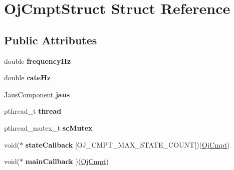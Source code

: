 \hypertarget{struct_oj_cmpt_struct}{\section{\-Oj\-Cmpt\-Struct \-Struct \-Reference}
\label{struct_oj_cmpt_struct}
}
\subsection*{\-Public \-Attributes}
\begin{DoxyCompactItemize}
\item 
\hypertarget{struct_oj_cmpt_struct_ae3a65bcae4e477b648a72cc26403dfec}{double {\bfseries frequency\-Hz}}\label{struct_oj_cmpt_struct_ae3a65bcae4e477b648a72cc26403dfec}

\item 
\hypertarget{struct_oj_cmpt_struct_a2cf5845176e0d4ecd136331aa1e3f476}{double {\bfseries rate\-Hz}}\label{struct_oj_cmpt_struct_a2cf5845176e0d4ecd136331aa1e3f476}

\item 
\hypertarget{struct_oj_cmpt_struct_a7e5a74cb68bdaa070dc0bdbab347a73b}{\hyperlink{struct_jaus_component_struct}{\-Jaus\-Component} {\bfseries jaus}}\label{struct_oj_cmpt_struct_a7e5a74cb68bdaa070dc0bdbab347a73b}

\item 
\hypertarget{struct_oj_cmpt_struct_a4cfe9bab709c357c7f65f363d19407a6}{pthread\-\_\-t {\bfseries thread}}\label{struct_oj_cmpt_struct_a4cfe9bab709c357c7f65f363d19407a6}

\item 
\hypertarget{struct_oj_cmpt_struct_a9e8c1e0b1739d46753708af0b28b12ed}{pthread\-\_\-mutex\-\_\-t {\bfseries sc\-Mutex}}\label{struct_oj_cmpt_struct_a9e8c1e0b1739d46753708af0b28b12ed}

\item 
\hypertarget{struct_oj_cmpt_struct_ad677e60331f2100214030ab7a5c57fdc}{void($\ast$ {\bfseries state\-Callback} \mbox{[}\-O\-J\-\_\-\-C\-M\-P\-T\-\_\-\-M\-A\-X\-\_\-\-S\-T\-A\-T\-E\-\_\-\-C\-O\-U\-N\-T\mbox{]})(\hyperlink{struct_oj_cmpt_struct}{\-Oj\-Cmpt})}\label{struct_oj_cmpt_struct_ad677e60331f2100214030ab7a5c57fdc}

\item 
\hypertarget{struct_oj_cmpt_struct_a7e90175b968f666504bf760e5132eac9}{void($\ast$ {\bfseries main\-Callback} )(\hyperlink{struct_oj_cmpt_struct}{\-Oj\-Cmpt})}\label{struct_oj_cmpt_struct_a7e90175b968f666504bf760e5132eac9}


\end{DoxyCompactItemize}
